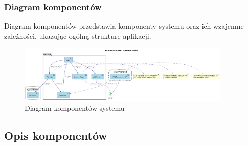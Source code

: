 \documentclass[12pt,a4paper]{article}
\begin{document}
\subsubsection{Diagram komponentów}

Diagram komponentów przedstawia komponenty systemu oraz ich wzajemne zależności, ukazując ogólną strukturę aplikacji.

\begin{figure}[h]
\centering
\includegraphics[width=0.9\textwidth]{plantuml/component_diagram.png}
\caption{Diagram komponentów systemu}
\label{fig:component-diagram}
\end{figure}

\subsection{Opis komponentów}
\end{document}

